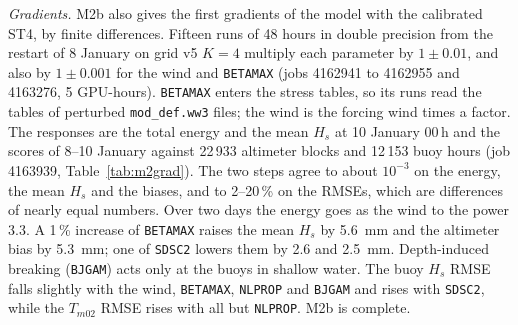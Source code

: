 \documentclass[11pt,a4paper]{article}
\begin{document}
\emph{Gradients.} M2b also gives the first gradients of the model with the
calibrated ST4, by finite differences. Fifteen runs of 48 hours in double
precision from the restart of 8 January on grid v5 $K=4$ multiply each
parameter by $1\pm0.01$, and also by $1\pm0.001$ for the wind and
\texttt{BETAMAX} (jobs 4162941 to 4162955 and 4163276, 5 GPU-hours).
\texttt{BETAMAX} enters the stress tables, so its runs read the tables of
perturbed \texttt{mod\_def.ww3} files; the wind is the forcing wind times a
factor. The responses are the total energy and the mean $H_s$ at
10 January 00\,h and the scores of 8--10 January against 22\,933 altimeter
blocks and 12\,153 buoy hours (job 4163939, Table~\ref{tab:m2grad}). The
two steps agree to about $10^{-3}$ on the energy, the mean $H_s$ and the
biases, and to 2--20\,\% on the RMSEs, which are differences of nearly
equal numbers. Over two days the energy goes as the wind to the power 3.3.
A 1\,\% increase of \texttt{BETAMAX} raises the mean $H_s$ by \SI{5.6}{mm}
and the altimeter bias by \SI{5.3}{mm}; one of \texttt{SDSC2} lowers them
by 2.6 and \SI{2.5}{mm}. Depth-induced breaking (\texttt{BJGAM}) acts only
at the buoys in shallow water. The buoy $H_s$ RMSE falls slightly with the
wind, \texttt{BETAMAX}, \texttt{NLPROP} and \texttt{BJGAM} and rises with
\texttt{SDSC2}, while the $T_{m02}$ RMSE rises with all but
\texttt{NLPROP}. M2b is complete.
\end{document}
